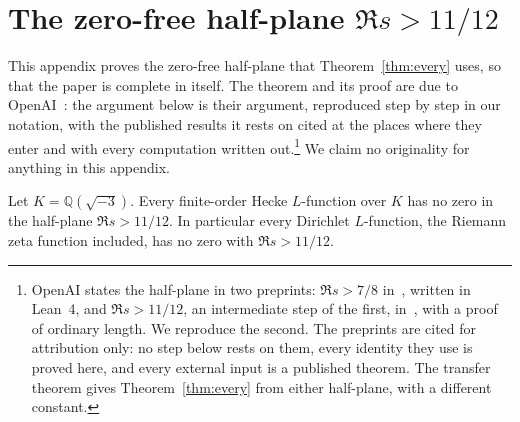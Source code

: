 \section{The zero-free half-plane $\Re s>11/12$}\label{app:halfplane}

\providecommand{\Q}{\mathbb{Q}}
\newcommand{\NK}{\mathrm{N}}
\newcommand{\OO}{\mathcal{O}}
\newcommand{\En}{\mathcal{E}}
\newcommand{\ind}{\mathbf{1}}
\newcommand{\rad}{\operatorname{rad}}
\newcommand{\dd}{\,d}
\newcommand{\precbd}{\preccurlyeq}
\newcommand{\sfstar}{\sideset{}{^*}\sum}

This appendix proves the zero-free half-plane that Theorem~\ref{thm:every} uses, so that the paper is complete in itself. The theorem and its proof are due to OpenAI~\cite{OAI26b}: the argument below is their argument, reproduced step by step in our notation, with the published results it rests on cited at the places where they enter and with every computation written out.\footnote{OpenAI states the half-plane in two preprints: $\Re s>7/8$ in~\cite{OAI26}, written in Lean~4, and $\Re s>11/12$, an intermediate step of the first, in~\cite{OAI26b}, with a proof of ordinary length. We reproduce the second. The preprints are cited for attribution only: no step below rests on them, every identity they use is proved here, and every external input is a published theorem. The transfer theorem gives Theorem~\ref{thm:every} from either half-plane, with a different constant.} We claim no originality for anything in this appendix.

\begin{theorem}[OpenAI]\label{thm:b:main}
Let $K=\Q(\sqrt{-3})$. Every finite-order Hecke $L$-function over $K$ has no zero in the half-plane $\Re s>11/12$. In particular every Dirichlet $L$-function, the Riemann zeta function included, has no zero with $\Re s>11/12$.
\end{theorem}

